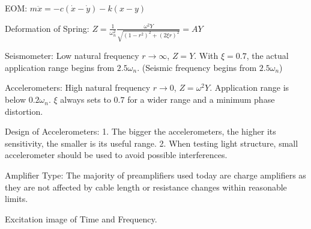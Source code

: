 \documentclass{article}
\begin{document}
\begin{multicols*}{3}
EOM: $m \ddot{x} = -c(\dot{x}-\dot{y}) - k(x-y)$

Deformation of Spring: $Z = \frac{1}{\omega_n^2} \frac{\omega^2Y}{\sqrt{(1-r^2)^2+(2\xi r)^2}} = A Y$

Seismometer: Low natural frequency $r\rightarrow\infty$, $Z = Y$. With $\xi=0.7$, the actual application range begins from $2.5\omega_n$. (Seismic frequency begins from $2.5\omega_n$)

Accelerometers: High natural frequency $r\rightarrow0$, $Z = \omega^2Y$. Application range is below $0.2\omega_n$. $\xi$ always sets to $0.7$ for a wider range and a minimum phase distortion.

Design of Accelerometers: 1. The bigger the accelerometers, the higher its sensitivity, the smaller is its useful range. 2. When testing light structure, small accelerometer should be used to avoid possible interferences.

Amplifier Type: The majority of preamplifiers used today are charge amplifiers as they are not affected by cable length or resistance changes within reasonable limits.

Excitation image of Time and Frequency.





\end{multicols*}
\end{document}
